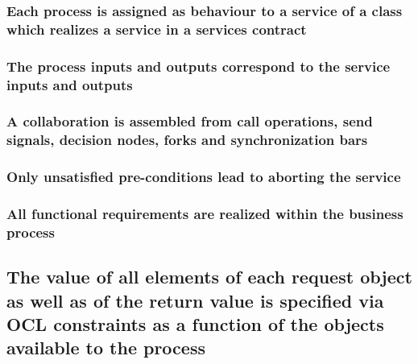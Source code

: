 
\subsubsection{Each process is assigned as behaviour to a service of a class which realizes a service in a services contract}

\subsubsection{The process inputs and outputs correspond to the service inputs and outputs}


\subsubsection{A collaboration is assembled from call operations, send signals, decision nodes, forks and synchronization bars}


\subsubsection{Only unsatisfied pre-conditions lead to aborting the service}


\subsubsection{All functional requirements are realized within the business process}


\subsection{The value of all elements of each request object as well as of the return value is specified via OCL constraints as a function of the objects available to the process}


